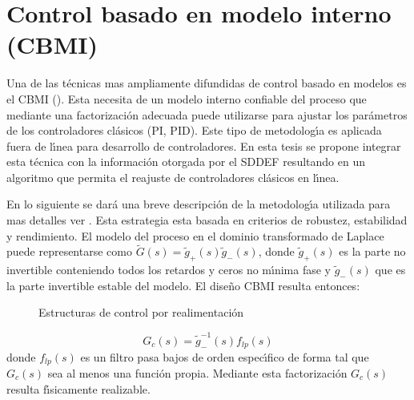 \section{Control basado en modelo interno (CBMI)}\label{A_5}
Una de las t{\'e}cnicas mas ampliamente difundidas de control basado en modelos es el CBMI (\cite{Rd:07,Rd:86}).
Esta necesita de un modelo interno confiable del proceso que mediante una factorizaci{\'o}n adecuada puede
utilizarse para ajustar los par{\'a}metros de los controladores cl{\'a}sicos (PI, PID). Este tipo de metodolog{\'\i}a es
aplicada fuera de l{\'\i}nea para desarrollo de controladores. En esta tesis se propone integrar esta t{\'e}cnica con
la informaci{\'o}n otorgada por el SDDEF resultando en un algoritmo que permita el reajuste de controladores
cl{\'a}sicos en l{\'\i}nea.

En lo siguiente se dar{\'a} una breve descripci{\'o}n de la metodolog{\'\i}a utilizada para mas detalles ver
\cite{Rd:07,Rd:86}. Esta estrategia esta basada en criterios de robustez, estabilidad y rendimiento. El
modelo del proceso en el dominio transformado de Laplace puede representarse como
$\tilde{G}(s)=\tilde{g}_{+}(s)\tilde{g}_{-}(s)$, donde $\tilde{g}_{+}(s)$ es la parte no invertible
conteniendo todos los retardos y ceros no m{\'\i}nima fase y $\tilde{g}_{-}(s)$ que es la parte invertible
estable del modelo. El dise{\~n}o CBMI resulta entonces:
\begin{figure}[t]
\centering%
\caption{Estructuras de control por realimentaci{\'o}n} \label{fa1}
\end{figure}
\begin{equation}
    G_{c}(s)=\tilde{g}_{-}^{-1}(s)f_{lp}(s)
\end{equation}
donde $f_{lp}(s)$ es un filtro pasa bajos de orden espec{\'\i}fico de forma tal que $G_{c}(s)$ sea al menos una
funci{\'o}n propia. Mediante esta factorizaci{\'o}n $G_{c}(s)$ resulta f{\'\i}sicamente realizable.

